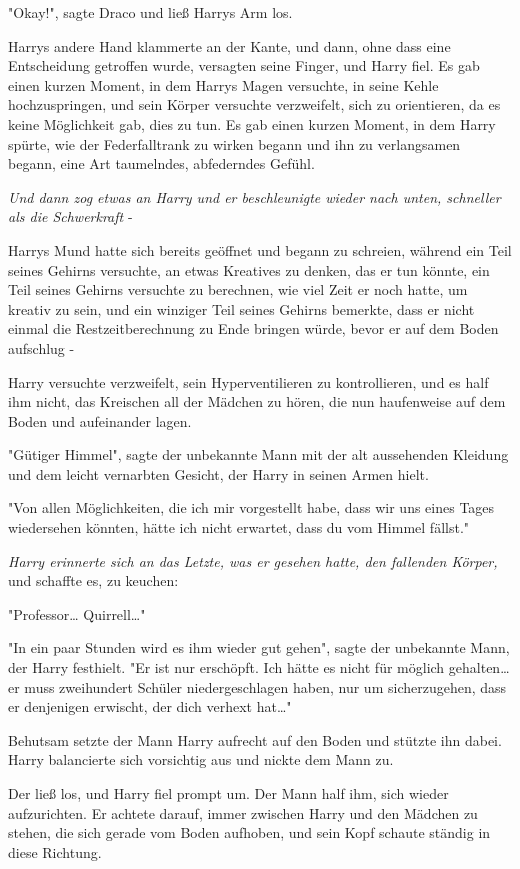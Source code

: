 {"Okay!", sagte Draco und ließ Harrys Arm los.

Harrys andere Hand klammerte an der Kante, und dann, ohne dass eine Entscheidung getroffen wurde, versagten seine Finger, und Harry fiel. Es gab einen kurzen Moment, in dem Harrys Magen versuchte, in seine Kehle hochzuspringen, und sein Körper versuchte verzweifelt, sich zu orientieren, da es keine Möglichkeit gab, dies zu tun. Es gab einen kurzen Moment, in dem Harry spürte, wie der Federfalltrank zu wirken begann und ihn zu verlangsamen begann, eine Art taumelndes, abfederndes Gefühl.

\emph{Und dann zog etwas an Harry und er beschleunigte wieder nach unten, schneller als die Schwerkraft} -

Harrys Mund hatte sich bereits geöffnet und begann zu schreien, während ein Teil seines Gehirns versuchte, an etwas Kreatives zu denken, das er tun könnte, ein Teil seines Gehirns versuchte zu berechnen, wie viel Zeit er noch hatte, um kreativ zu sein, und ein winziger Teil seines Gehirns bemerkte, dass er nicht einmal die Restzeitberechnung zu Ende bringen würde, bevor er auf dem Boden aufschlug -

Harry versuchte verzweifelt, sein Hyperventilieren zu kontrollieren, und es half ihm nicht, das Kreischen all der Mädchen zu hören, die nun haufenweise auf dem Boden und aufeinander lagen.

"Gütiger Himmel", sagte der unbekannte Mann mit der alt aussehenden Kleidung und dem leicht vernarbten Gesicht, der Harry in seinen Armen hielt.

"Von allen Möglichkeiten, die ich mir vorgestellt habe, dass wir uns eines Tages wiedersehen könnten, hätte ich nicht erwartet, dass du vom Himmel fällst."

\emph{Harry erinnerte sich an das Letzte, was er gesehen hatte, den fallenden Körper,} und schaffte es, zu keuchen:

"Professor… Quirrell…"

"In ein paar Stunden wird es ihm wieder gut gehen", sagte der unbekannte Mann, der Harry festhielt. "Er ist nur erschöpft. Ich hätte es nicht für möglich gehalten… er muss zweihundert Schüler niedergeschlagen haben, nur um sicherzugehen, dass er denjenigen erwischt, der dich verhext hat…"

Behutsam setzte der Mann Harry aufrecht auf den Boden und stützte ihn dabei. Harry balancierte sich vorsichtig aus und nickte dem Mann zu.

Der ließ los, und Harry fiel prompt um. Der Mann half ihm, sich wieder aufzurichten. Er achtete darauf, immer zwischen Harry und den Mädchen zu stehen, die sich gerade vom Boden aufhoben, und sein Kopf schaute ständig in diese Richtung.

}
